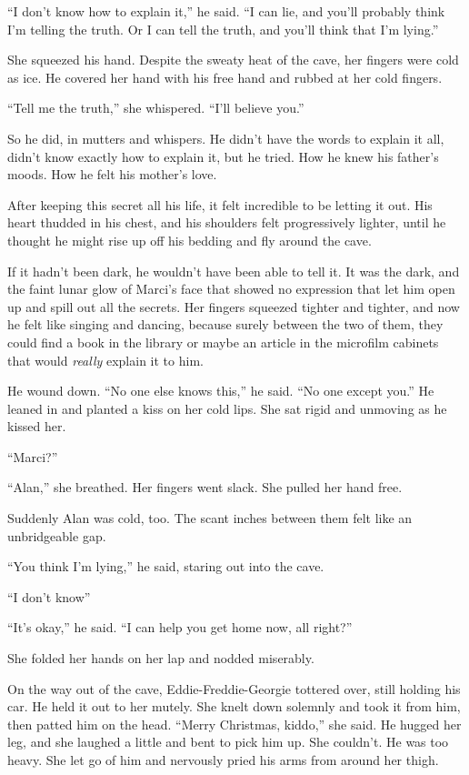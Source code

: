 ``I don't know how to explain it,'' he said.  ``I can lie, and you'll
probably think I'm telling the truth.  Or I can tell the truth, and
you'll think that I'm lying.''

She squeezed his hand.  Despite the sweaty heat of the cave, her
fingers were cold as ice.  He covered her hand with his free hand and
rubbed at her cold fingers.

``Tell me the truth,'' she whispered.  ``I'll believe you.''

So he did, in mutters and whispers.  He didn't have the words to
explain it all, didn't know exactly how to explain it, but he tried. 
How he knew his father's moods.  How he felt his mother's love.

After keeping this secret all his life, it felt incredible to be
letting it out.  His heart thudded in his chest, and his shoulders
felt progressively lighter, until he thought he might rise up off his
bedding and fly around the cave.

If it hadn't been dark, he wouldn't have been able to tell it.  It was
the dark, and the faint lunar glow of Marci's face that showed no
expression that let him open up and spill out all the secrets.  Her
fingers squeezed tighter and tighter, and now he felt like singing and
dancing, because surely between the two of them, they could find a
book in the library or maybe an article in the microfilm cabinets that
would \textit{really} explain it to him.

He wound down.  ``No one else knows this,'' he said.  ``No one except
you.'' He leaned in and planted a kiss on her cold lips.  She sat
rigid and unmoving as he kissed her.

``Marci?''

``Alan,'' she breathed.  Her fingers went slack.  She pulled her hand
free.

Suddenly Alan was cold, too.  The scant inches between them felt like
an unbridgeable gap.

``You think I'm lying,'' he said, staring out into the cave.

``I don't know\dash{}''

``It's okay,'' he said.  ``I can help you get home now, all right?''

She folded her hands on her lap and nodded miserably.

On the way out of the cave, Eddie-Freddie-Georgie tottered over, still
holding his car.  He held it out to her mutely.  She knelt down
solemnly and took it from him, then patted him on the head.  ``Merry
Christmas, kiddo,'' she said.  He hugged her leg, and she laughed a
little and bent to pick him up.  She couldn't.  He was too heavy.  She
let go of him and nervously pried his arms from around her thigh.

